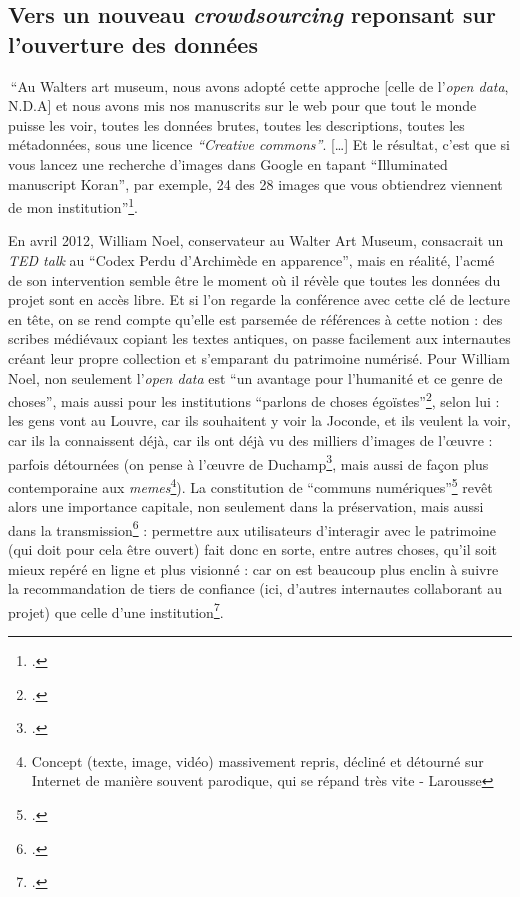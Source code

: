 \newpage

\subsection{Vers un nouveau \textit{crowdsourcing} reponsant sur l'ouverture des données}


 \enquote{Au Walters art museum, nous avons adopté cette approche [celle de l’\textit{open data}, N.D.A] et nous avons mis nos manuscrits sur le web pour que tout le monde puisse les voir, toutes les données brutes, toutes les descriptions, toutes les métadonnées, sous une licence \textit{“Creative commons”}. […] Et le résultat, c’est que si vous lancez une recherche d’images dans Google en tapant “Illuminated manuscript Koran”, par exemple, 24 des 28 images que vous obtiendrez viennent de mon institution}\footcite{noel_william_nodate}.

En avril 2012, William Noel, conservateur au Walter Art Museum, consacrait un \textit{TED talk} au \enquote{Codex Perdu d’Archimède en apparence}, mais en réalité, l’acmé de son intervention semble être le moment où il révèle que toutes les données du projet sont en accès libre. Et si l’on regarde la conférence avec cette clé de lecture en tête, on se rend compte qu’elle est parsemée de références à cette notion : des scribes médiévaux copiant les textes antiques, on passe facilement aux internautes créant leur propre collection et s’emparant du patrimoine numérisé. Pour William Noel, non seulement l’\textit{open data} est \enquote{un avantage pour l’humanité et ce genre de choses}, mais aussi pour les institutions \enquote{parlons de choses égoïstes}\footcite[à 13 minutes 26secondes]{noel_william_nodate}, selon lui : les gens vont au Louvre, car ils souhaitent y voir la Joconde, et ils veulent la voir, car ils la connaissent déjà, car ils ont déjà vu des milliers d’images de l’œuvre : parfois détournées (on pense à l’œuvre de Duchamp\footcite{zotero-368}, mais aussi de façon plus contemporaine aux \textit{memes}\footnote{Concept (texte, image, vidéo) massivement repris, décliné et détourné sur Internet de manière souvent parodique, qui se répand très vite - Larousse}). La constitution de \enquote{communs numériques}\footcite[p. 173]{bermes2024} revêt alors une importance capitale, non seulement dans la préservation, mais aussi dans la transmission\footcite[p. 175]{bermes2024} : permettre aux utilisateurs d’interagir avec le patrimoine (qui doit pour cela être ouvert) fait donc en sorte, entre autres choses, qu’il soit mieux repéré en ligne et plus visionné : car on est beaucoup plus enclin à suivre la recommandation de tiers de confiance (ici, d’autres internautes collaborant au projet) que celle d’une institution\footcite{ertzscheid2019}.

